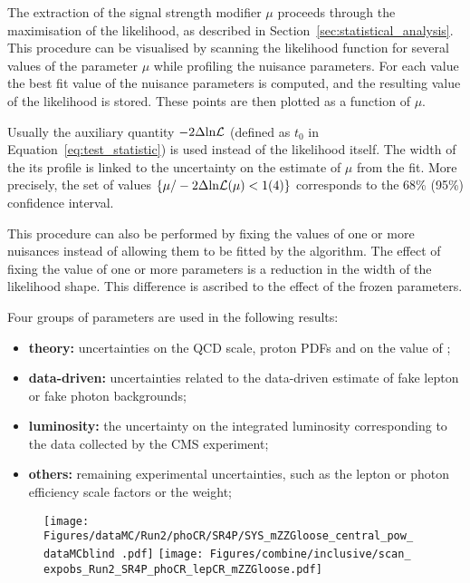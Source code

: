 \label{sec:likelihood_scans_inclusive}
The extraction of the signal strength modifier $\mu$ proceeds through the maximisation of the likelihood,
as described in Section~\ref{sec:statistical_analysis}.
This procedure can be visualised by scanning the likelihood function for several values of the parameter $\mu$ while profiling the nuisance parameters.
For each value the best fit value of the nuisance parameters is computed,
and the resulting value of the likelihood is stored.
These points are then plotted as a function of $\mu$.

Usually the auxiliary quantity $-2\Delta\text{ln}\mathcal{L}$ (defined as $t_0$ in Equation~\ref{eq:test_statistic})
is used instead of the likelihood itself.
The width of the its profile is linked to the uncertainty on the estimate of $\mu$ from the fit.
More precisely, the set of values $\{ \mu / -2\Delta\text{ln}\mathcal{L}(\mu) < 1 (4) \}$ corresponds to the 68\usep\% (95\usep\%) confidence interval.

This procedure can also be performed by fixing the values of one or more nuisances instead of allowing them to be fitted by the algorithm.
The effect of fixing the value of one or more parameters is a reduction in the width of the likelihood shape.
This difference is ascribed to the effect of the frozen parameters.

Four groups of parameters are used in the following results:
\begin{itemize}
\item \textbf{theory:} uncertainties on the QCD scale, proton PDFs and on the value of \alpS;
\item \textbf{data-driven:} uncertainties related to the data-driven estimate of fake lepton or fake photon backgrounds;
\item \textbf{luminosity:} the uncertainty on the integrated luminosity corresponding to the data collected by the CMS experiment;
\item \textbf{others:} remaining experimental uncertainties, such as the lepton or photon efficiency scale factors or the \pileup weight;
\end{itemize}

\begin{figure}
  \centering
  \texttt{[image: Figures/dataMC/Run2/phoCR/SR4P/SYS\_mZZGloose\_central\_pow\_\\dataMCblind .pdf]}
  \hfill
  \texttt{[image: Figures/combine/inclusive/scan\_\\expobs\_Run2\_SR4P\_phoCR\_lepCR\_mZZGloose.pdf]}
  \caption{}
  \label{fig:scan_Run2_SR4P_phoCR_lepCR_mZZGloose}
\end{figure}

